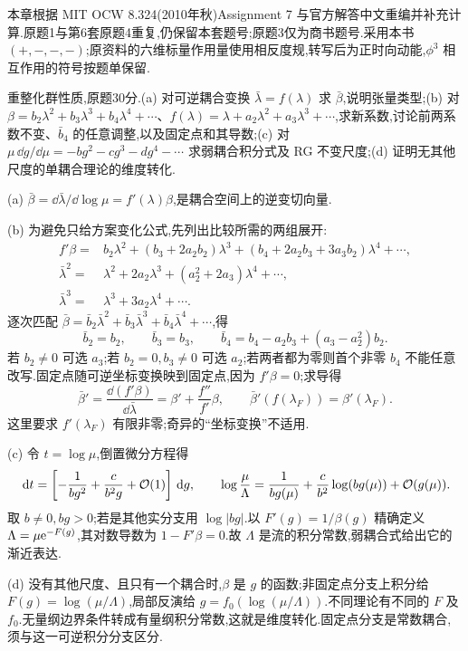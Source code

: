 本章根据 MIT OCW 8.324(2010年秋)Assignment 7 与官方解答中文重编并补充计算.原题1与第6套原题4重复,仍保留本套题号;原题3仅为商书题号.采用本书 $(+,-,-,-)$;原资料的六维标量作用量使用相反度规,转写后为正时向动能,$\phi^3$ 相互作用的符号按题单保留.

\begin{exercise}
重整化群性质,原题30分.(a) 对可逆耦合变换 $\bar\lambda=f(\lambda)$ 求 $\bar\beta$,说明张量类型;(b) 对 $\beta=b_2\lambda^2+b_3\lambda^3+b_4\lambda^4+\cdots$、$f(\lambda)=\lambda+a_2\lambda^2+a_3\lambda^3+\cdots$,求新系数,讨论前两系数不变、$\bar b_4$ 的任意调整,以及固定点和其导数;(c) 对 $\mu\,\dd g/\dd\mu=-bg^2-cg^3-dg^4-\cdots$ 求弱耦合积分式及 RG 不变尺度;(d) 证明无其他尺度的单耦合理论的维度转化.
\end{exercise}
\begin{solution}
(a) $\bar\beta=\dd\bar\lambda/\dd\log\mu=f'(\lambda)\beta$,是耦合空间上的逆变切向量.

(b) 为避免只给方案变化公式,先列出比较所需的两组展开:
\begin{align*}
f'\beta={}&b_2\lambda^2+(b_3+2a_2b_2)\lambda^3
+(b_4+2a_2b_3+3a_3b_2)\lambda^4+\cdots,\\
\bar\lambda^2={}&\lambda^2+2a_2\lambda^3+(a_2^2+2a_3)\lambda^4+\cdots,\\
\bar\lambda^3={}&\lambda^3+3a_2\lambda^4+\cdots.
\end{align*}
逐次匹配 $\bar\beta=\bar b_2\bar\lambda^2+\bar b_3\bar\lambda^3+\bar b_4\bar\lambda^4+\cdots$,得
\[
\bar b_2=b_2,\qquad\bar b_3=b_3,
\qquad\bar b_4=b_4-a_2b_3+(a_3-a_2^2)b_2.
\]
若 $b_2\ne0$ 可选 $a_3$;若 $b_2=0,b_3\ne0$ 可选 $a_2$;若两者都为零则首个非零 $b_4$ 不能任意改写.固定点随可逆坐标变换映到固定点,因为 $f'\beta=0$;求导得
\[
\bar\beta'=\frac{\dd(f'\beta)}{\dd\bar\lambda}
=\beta'+\frac{f''}{f'}\beta,
\qquad\bar\beta'(f(\lambda_F))=\beta'(\lambda_F).
\]
这里要求 $f'(\lambda_F)$ 有限非零;奇异的“坐标变换”不适用.

(c) 令 $t=\log\mu$,倒置微分方程得
\[
\,\mathrm d t=\left[-\frac1{bg^2}+\frac c{b^2g}+\mathcal O(1)\right]\,\mathrm d g,
\qquad
\log\frac\mu\Lambda=\frac1{bg(\mu)}+
\frac c{b^2}\log(bg(\mu))+\mathcal O(g(\mu)).
\]
取 $b\ne0,bg>0$;若是其他实分支用 $\log|bg|$.以 $F'(g)=1/\beta(g)$ 精确定义 $\Lambda=\mu\mathrm e^{-F(g)}$,其对数导数为 $1-F'\beta=0$.故 $\Lambda$ 是流的积分常数,弱耦合式给出它的渐近表达.

(d) 没有其他尺度、且只有一个耦合时,$\beta$ 是 $g$ 的函数;非固定点分支上积分给 $F(g)=\log(\mu/\Lambda)$,局部反演给 $g=f_0(\log(\mu/\Lambda))$.不同理论有不同的 $F$ 及 $f_0$.无量纲边界条件转成有量纲积分常数,这就是维度转化.固定点分支是常数耦合,须与这一可逆积分分支区分.
\end{solution}

